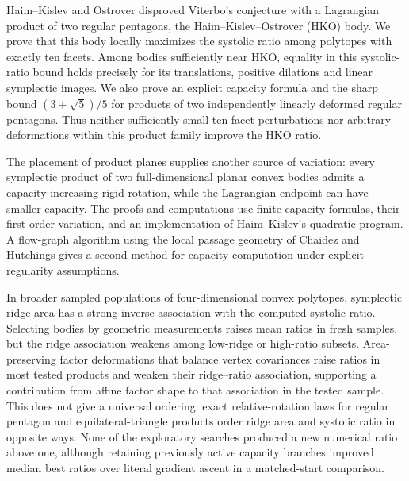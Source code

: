Haim--Kislev and Ostrover disproved Viterbo's conjecture with a Lagrangian
product of two regular pentagons, the Haim--Kislev--Ostrover (HKO) body.
We prove that this body locally maximizes the systolic ratio among
polytopes with exactly ten facets. Among bodies sufficiently near HKO,
equality in this systolic-ratio bound holds precisely for its translations,
positive dilations and linear symplectic images. We also prove an explicit capacity formula and the sharp
bound $(3+\sqrt5)/5$ for products of two independently linearly deformed
regular pentagons. Thus neither sufficiently small ten-facet perturbations
nor arbitrary deformations within this product family improve the HKO ratio.

The placement of product planes supplies another source of variation:
every symplectic product of two full-dimensional planar convex bodies admits
a capacity-increasing rigid rotation, while the Lagrangian endpoint can
have smaller capacity. The proofs and computations use finite capacity
formulas, their first-order variation, and an implementation of
Haim--Kislev's quadratic program. A flow-graph algorithm using the local
passage geometry of Chaidez and Hutchings gives a second method for
capacity computation under explicit regularity assumptions.

In broader sampled populations of four-dimensional convex polytopes,
symplectic ridge area has a strong inverse association with the computed
systolic ratio. Selecting bodies by geometric measurements raises mean
ratios in fresh samples, but the ridge association weakens among low-ridge
or high-ratio subsets. Area-preserving factor deformations that balance
vertex covariances raise ratios in most tested products and weaken their
ridge--ratio association, supporting a contribution from affine factor
shape to that association in the tested sample. This does not give a
universal ordering: exact relative-rotation laws for regular pentagon and
equilateral-triangle products order ridge area and systolic ratio in
opposite ways. None of the exploratory searches produced a new numerical
ratio above one, although retaining previously active capacity branches
improved median best ratios over literal gradient ascent in a matched-start
comparison.
